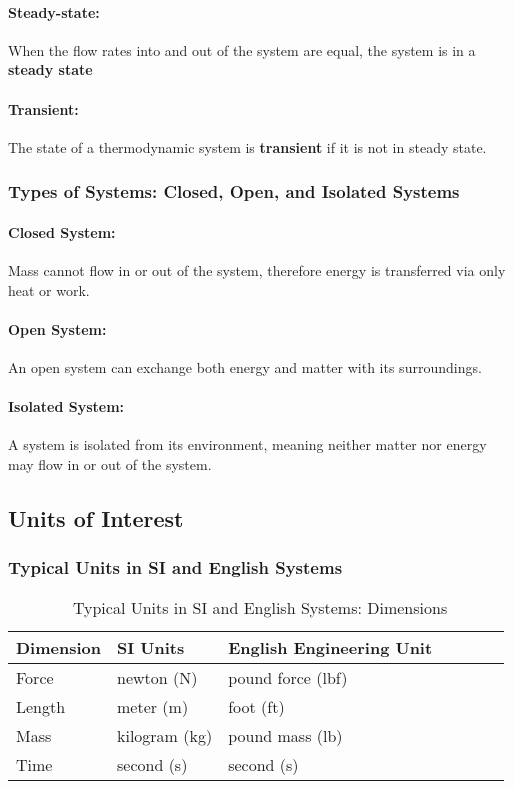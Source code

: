 \paragraph{Steady-state:} When the flow rates into and out of the system are equal, the system is in a \textbf{steady state}
\paragraph{Transient:} The state of a thermodynamic system is \textbf{transient} if it is not in steady state.

\subsubsection{Types of Systems: Closed, Open, and Isolated Systems} 
\paragraph{Closed System:} Mass cannot flow in or out of the system, therefore energy is transferred via only heat or work.

\paragraph{Open System:} An open system can exchange both energy and matter with its surroundings.

\paragraph{Isolated System:} A system is isolated from its environment, meaning neither matter nor energy may flow in or out of the system. 
\subsection{Units of Interest}
\subsubsection{Typical Units in SI and English Systems}

\begin{table*}[h]
\small
  \caption{\ Typical Units in SI and English Systems: Dimensions}
  \label{tbl:units}
  \begin{tabular*}{\textwidth}{@{\extracolsep{\fill}}lllllll}
    \hline
    Dimension & SI Units  & English Engineering Unit \\
    \hline
    Force & newton (N) &  pound force (lbf) \\
    Length & meter (m) &  foot (ft) \\
    Mass & kilogram (kg) &  pound mass (lb) \\
    Time & second (s) &  second (s) \\
  \end{tabular*}
\end{table*}

